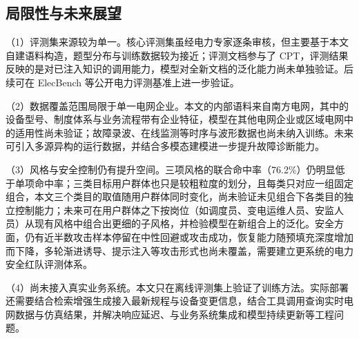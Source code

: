 \documentclass[fontset=fandol,type=master,campus=shenzhen,etitleauto=true]{hithesisbook}
\begin{document}
\begin{conclusions}
\section*{局限性与未来展望}\label{ux5c40ux9650ux6027ux4e0eux672aux6765ux5c55ux671b}

\noindent （1）评测集来源较为单一。核心评测集虽经电力专家逐条审核，但主要基于本文自建语料构造，题型分布与训练数据较为接近；评测文档参与了 CPT，评测结果反映的是对已注入知识的调用能力，模型对全新文档的泛化能力尚未单独验证。后续可在 ElecBench\cite{ref21} 等公开电力评测基准上进一步验证。

\noindent （2）数据覆盖范围局限于单一电网企业。本文的内部语料来自南方电网，其中的设备型号、制度体系与业务流程带有企业特征，模型在其他电网企业或区域电网中的适用性尚未验证；故障录波、在线监测等时序与波形数据也尚未纳入训练。未来可引入多源异构的运行数据，并结合多模态建模进一步提升故障诊断能力。

\noindent （3）风格与安全控制仍有提升空间。三项风格的联合命中率（76.2\%）仍明显低于单项命中率；三类目标用户群体也只是较粗粒度的划分，且每类只对应一组固定组合，本文三个类目的取值随用户群体同时变化，尚未验证未见组合下各类目的独立控制能力；未来可在用户群体之下按岗位（如调度员、变电运维人员、安监人员）从现有风格中组合出更细的子风格，并检验模型在新组合上的泛化。安全方面，仍有近半数攻击样本停留在中性回避或攻击成功，恢复能力随预填充深度增加而下降，多轮渐进诱导、提示注入等攻击形式也尚未覆盖，需要建立更系统的电力安全红队评测体系。

\noindent （4）尚未接入真实业务系统。本文只在离线评测集上验证了训练方法。实际部署还需要结合检索增强生成接入最新规程与设备变更信息，结合工具调用查询实时电网数据与仿真结果，并解决响应延迟、与业务系统集成和模型持续更新等工程问题。

\end{conclusions}
\end{document}
